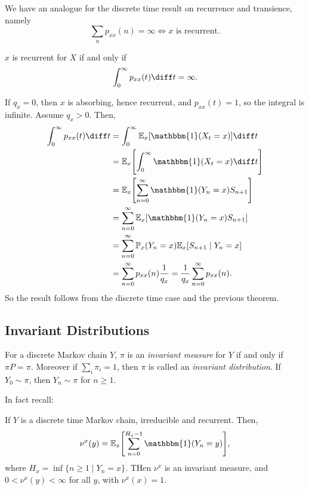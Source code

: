 \documentclass[12pt]{article}
\begin{document}
We have an analogue for the discrete time result on recurrence and transience, namely
\[
	\sum_{n} p_{x x}(n) = \infty \iff x \text{ is recurrent}
.\]
\begin{theorem}
	$x$ is recurrent for $X$ if and only if
	\[
	\int_{0}^{\infty} p_{x x}(t) \diff t = \infty
	.\]
\end{theorem}

\begin{proofbox}
	If $q_x = 0$, then $x$ is absorbing, hence recurrent, and $p_{x x}(t) = 1$, so the integral is infinite. Assume $q_x > 0$. Then,
	\begin{align*}
		\int_{0}^{\infty}p_{x x}(t) \diff t &= \int_{0}^{\infty} \mathbb{E}_x[\mathbbm{1}(X_t = x)] \diff t \\
						    &= \mathbb{E}_x \Biggl[ \int_{0}^{\infty} \mathbbm{1}(X_t = x) \diff t \Biggr] \\
						    &= \mathbb{E}_x \Biggl[ \sum_{n = 0}^{\infty} \mathbbm{1}(Y_n = x)S_{n+1} \Biggr] \\
						    &= \sum_{n = 0}^{\infty} \mathbb{E}_x [\mathbbm{1}(Y_n = x) S_{n+1}] \\
						    &= \sum_{n = 0}^{\infty} \mathbb{P}_x (Y_n = x) \mathbb{E}_x[S_{n+1} \mid Y_n = x] \\
						    &= \sum_{n = 0}^{\infty} p_{x x}(n) \frac{1}{q_x} = \frac{1}{q_x} \sum_{n = 0}^{\infty} p_{x x}(n).
	\end{align*}
	So the result follows from the discrete time case and the previous theorem.
\end{proofbox}

\subsection{Invariant Distributions}
\label{sub:invariant_distributions}

For a discrete Markov chain $Y$, $\pi$ is an \emph{invariant measure} for $Y$ if and only if $\pi P = \pi$. Moreover if $\sum_i \pi_i = 1$, then $\pi$ is called an \emph{invariant distribution}. If $Y_0 \sim \pi$, then $Y_n \sim \pi$ for $n \geq 1$.

In fact recall:
\begin{theorem}
	If $Y$ is a discrete time Markov chain, irreducible and recurrent. Then,
	\[
		\nu^{x}(y) = \mathbb{E}_x \Biggl[ \sum_{n = 0}^{H_x - 1} \mathbbm{1}(Y_n = y) \Biggr]
	,\]
	where $H_x = \inf \{n \geq 1 \mid Y_n = x\}$. THen $\nu^{x}$ is an invariant measure, and $0 < \nu^{x}(y) < \infty$ for all $y$, with $\nu^{x}(x) = 1$.
\end{theorem}
\end{document}

